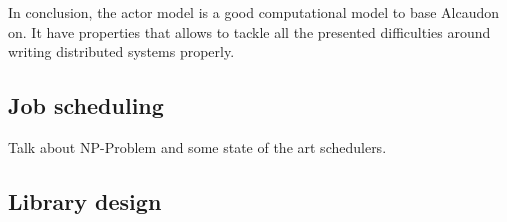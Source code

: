 In conclusion, the actor model is a good computational model to base Alcaudon
on. It have properties that allows to tackle all the presented difficulties
around writing distributed systems properly.

\subsection{Job scheduling}

Talk about NP-Problem and some state of the art schedulers.

\subsection{Library design}
